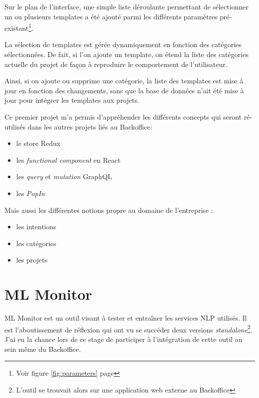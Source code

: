 \documentclass[12pt,a4paper,oneside]{scrreprt}
\begin{document}
Sur le plan de l'interface, une simple liste déroulante permettant de sélectionner un ou plusieurs templates a été ajouté parmi les différents paramètres pré-existant\footnote{Voir figure \ref{fig:parameters} page \pageref{fig:parameters}}.

\begin{result}
	La sélection de templates est gérée dynamiquement en fonction des catégories sélectionnées. De fait, si l'on ajoute un template, on étend la liste des catégories actuelle du projet de façon à reproduire le comportement de l'utilisateur.

	Ainsi, si on ajoute ou supprime une catégorie, la liste des templates est mise à jour en fonction des changements, sans que la base de données n'ait été mise à jour pour intégrer les templates aux projets.
\end{result}


\begin{info}
	Ce premier projet m'a permis d'appréhender les différents concepts qui seront ré-utilisés dans les autres projets liés au Backoffice:
	\begin{itemize}
		\item le store Redux
		\item les \textit{functional component} en React
		\item les \textit{query} et \textit{mutation} GraphQL
		\item les \textit{PopIn}
	\end{itemize}

	Mais aussi les différentes notions propre au domaine de l'entreprise :
	\begin{itemize}
		\item les intentions
		\item les catégories
		\item les projets
	\end{itemize}
\end{info}

\section{ML Monitor}

ML Monitor est un outil visant à tester et entraîner les services NLP utilisés. Il est l'aboutissement de réflexion qui ont vu se succéder deux versions \textit{standalone}\footnote{L'outil se trouvait alors sur une application web externe au Backoffice}. J'ai eu la chance lors de ce stage de participer à l'intégration de cette outil au sein même du Backoffice.
\end{document}

